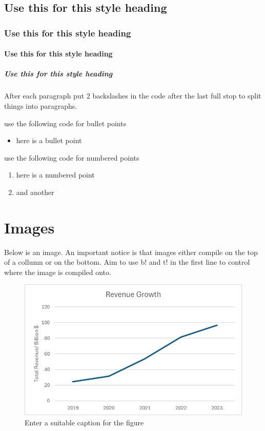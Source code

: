 \documentclass[a4paper,num-refs]{oup-contemporary}
\begin{document}
\subsection{Use this for this style heading}

\subsubsection{Use this for this style heading}

\paragraph{Use this for this style heading}

\subparagraph{Use this for this style heading}

After each paragraph put 2 backslashes in the code after the last full stop to split things into paragraphs.

use the following code for bullet points
\begin{itemize}
    \item here is a bullet point
\end{itemize}

use the following code for numbered points
\begin{enumerate}
    \item here is a numbered point 
    \item and another
\end{enumerate}



\section{Images}

Below is an image. An important notice is that images either compile on the top of a collumn or on the bottom. Aim to use b! and t! in the first line to control where the image is compiled onto.\\

\begin{figure}[b!] %
\centering
\includegraphics[width=\linewidth]{Images/RevenueGrowth.png}
\caption{Enter a suitable caption for the figure}\label{fig:example}
\end{figure}
\end{document}
